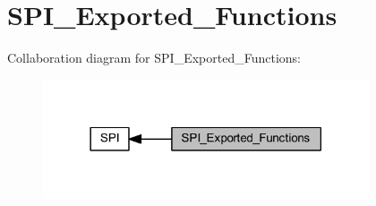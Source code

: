 \hypertarget{group___s_p_i___exported___functions}{}\section{S\+P\+I\+\_\+\+Exported\+\_\+\+Functions}
\label{group___s_p_i___exported___functions}
Collaboration diagram for S\+P\+I\+\_\+\+Exported\+\_\+\+Functions\+:
\nopagebreak
\begin{figure}[H]
\begin{center}
\leavevmode
\includegraphics[width=273pt]{group___s_p_i___exported___functions}
\end{center}
\end{figure}
